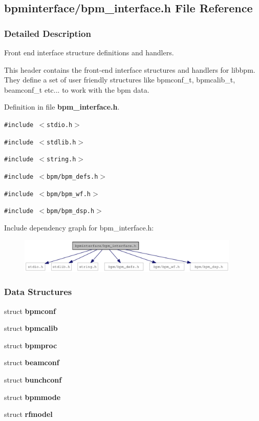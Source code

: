 \subsection{bpminterface/bpm\_\-interface.h File Reference}
\label{bpm__interface_8h}


\subsubsection{Detailed Description}
Front end interface structure definitions and handlers. 

This header contains the front-end interface structures and handlers for libbpm. They define a set of user friendly structures like bpmconf\_\-t, bpmcalib\_\-t, beamconf\_\-t etc... to work with the bpm data. 

Definition in file {\bf bpm\_\-interface.h}.

{\tt \#include $<$stdio.h$>$}\par
{\tt \#include $<$stdlib.h$>$}\par
{\tt \#include $<$string.h$>$}\par
{\tt \#include $<$bpm/bpm\_\-defs.h$>$}\par
{\tt \#include $<$bpm/bpm\_\-wf.h$>$}\par
{\tt \#include $<$bpm/bpm\_\-dsp.h$>$}\par


Include dependency graph for bpm\_\-interface.h:\nopagebreak
\begin{figure}[H]
\begin{center}
\leavevmode
\includegraphics[width=299pt]{bpm__interface_8h__incl}
\end{center}
\end{figure}
\subsubsection*{Data Structures}
\begin{CompactItemize}
\item 
struct {\bf bpmconf}
\item 
struct {\bf bpmcalib}
\item 
struct {\bf bpmproc}
\item 
struct {\bf beamconf}
\item 
struct {\bf bunchconf}
\item 
struct {\bf bpmmode}
\item 
struct {\bf rfmodel}
\end{CompactItemize}
